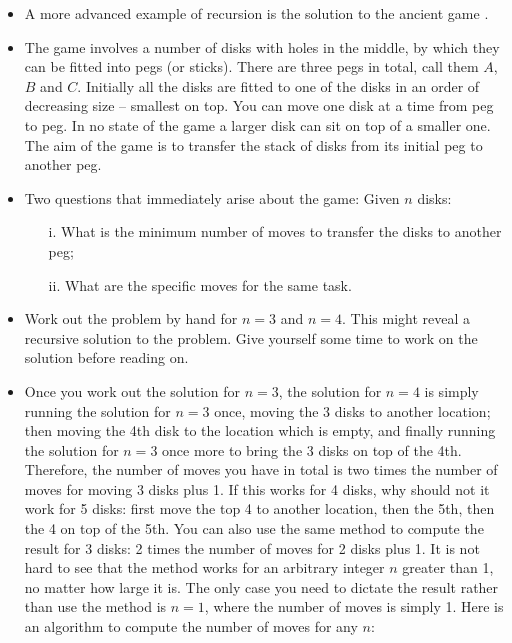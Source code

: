 \documentclass[a4paper]{article}
\begin{document}
{\begin{itemize}
\begin{uexercise}
\begin{enumerate}
\item Write Python code implementing the recursive algorithm.
\begin{hide}
\begin{usolution}
\begin{ucodeframe}
\end{ucodeframe}
\end{usolution}
\end{hide}
\end{enumerate}
\end{uexercise}


\item A more advanced example of recursion is the solution to the ancient
game \href{https://en.wikipedia.org/wiki/Tower_of_Hanoi}{}.

\item The game involves a number of disks with holes in the middle, by which
they can be fitted into pegs (or sticks). There are three pegs in total, call
them $A$, $B$ and $C$. Initially all the disks are fitted to one of the disks in
an order of decreasing size -- smallest on top. You can move one disk at a time
from peg to peg. In no state of the game a larger disk can sit on top of a
smaller one. The aim of the game is to transfer the stack of disks from its
initial peg to another peg.

\item Two questions that immediately arise about the game: Given $n$ disks:
	\begin{itemize}
	\item[i.] What is the minimum number of moves to transfer the disks to
	another peg;
	\item[ii.] What are the specific moves for the same task. 
	\end{itemize}

\item Work out the problem by hand for $n=3$ and $n=4$. This might reveal a recursive
solution to the problem. Give yourself some time to work on the solution before
reading on.

\item Once you work out the solution for $n=3$, the solution for $n=4$ is simply
running the solution for $n=3$ once,  moving the 3 disks to another location;
then moving the 4th disk to the location which is empty, and finally running the
solution for $n=3$ once more to bring the 3 disks on top of the 4th. Therefore,
the number of moves you have in total is two times the number of moves for
moving 3 disks plus 1. If this works for 4 disks, why should not it work for 5
disks: first move the top 4 to another location, then the 5th, then the 4 on top
of the 5th. You can also use the same method to compute the result for 3 disks:
2 times the number of moves for 2 disks plus 1. It is not hard to see that the
method works for an arbitrary integer $n$ greater than 1, no matter how large it
is. The only case you need to dictate the result rather than use the method is
$n=1$, where the number of moves is simply 1. Here is an algorithm to compute
the number of moves for any $n$:


\end{itemize}}
\end{document}
